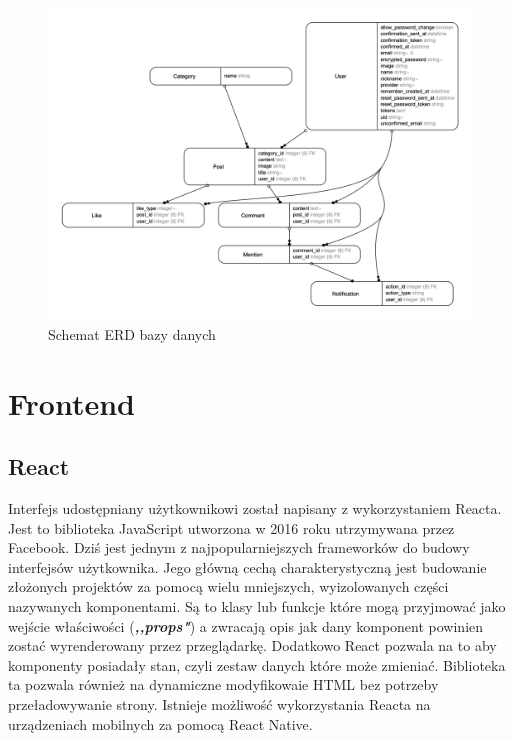 \documentclass[declaration,shortabstract]{iithesis}
\begin{document}
\begin{figure}
    \centering
    \includegraphics[width=\textwidth]{images/erd.png}
    \caption{Schemat ERD bazy danych}
    \label{fig:erd_diagram}
\end{figure}
\section{Frontend}

\subsection{React}
Interfejs udostępniany użytkownikowi został napisany z wykorzystaniem Reacta. Jest to biblioteka JavaScript utworzona w 2016 roku utrzymywana przez Facebook. Dziś jest jednym z najpopularniejszych frameworków do budowy interfejsów użytkownika. Jego główną cechą charakterystyczną jest budowanie złożonych projektów za pomocą wielu mniejszych, wyizolowanych części nazywanych komponentami. Są to klasy lub funkcje które mogą przyjmować jako wejście właściwości (\textbf{\textit{,,props"}}) a zwracają opis jak dany komponent powinien zostać wyrenderowany przez przeglądarkę. Dodatkowo React pozwala na to aby komponenty posiadały stan, czyli zestaw danych które może zmieniać. Biblioteka ta pozwala również na dynamiczne modyfikowaie HTML bez potrzeby przeładowywanie strony. Istnieje możliwość wykorzystania Reacta na urządzeniach mobilnych za pomocą React Native.
\end{document}
